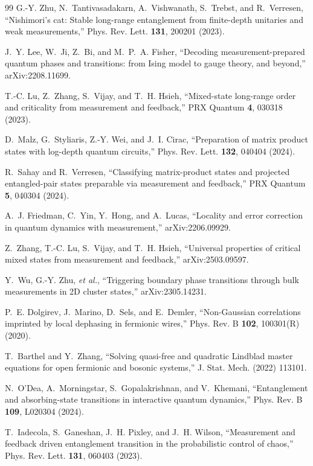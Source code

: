 \documentclass[aps,prl,twocolumn,floatfix,superscriptaddress,nofootinbib]{revtex4-2}
\begin{document}
\begin{thebibliography}{99}
G.-Y. Zhu, N.~Tantivasadakarn, A.~Vishwanath, S.~Trebst, and R.~Verresen,
``Nishimori's cat: Stable long-range entanglement from finite-depth unitaries and weak measurements,''
Phys. Rev. Lett. \textbf{131}, 200201 (2023).

J.~Y. Lee, W.~Ji, Z.~Bi, and M.~P.~A. Fisher,
``Decoding measurement-prepared quantum phases and transitions: from Ising model to gauge theory, and beyond,''
arXiv:2208.11699.

T.-C. Lu, Z.~Zhang, S.~Vijay, and T.~H. Hsieh,
``Mixed-state long-range order and criticality from measurement and feedback,''
PRX Quantum \textbf{4}, 030318 (2023).

D.~Malz, G.~Styliaris, Z.-Y. Wei, and J.~I. Cirac,
``Preparation of matrix product states with log-depth quantum circuits,''
Phys. Rev. Lett. \textbf{132}, 040404 (2024).

R.~Sahay and R.~Verresen,
``Classifying matrix-product states and projected entangled-pair states preparable via measurement and feedback,''
PRX Quantum \textbf{5}, 040304 (2024).

A.~J. Friedman, C.~Yin, Y.~Hong, and A.~Lucas,
``Locality and error correction in quantum dynamics with measurement,''
arXiv:2206.09929.

Z.~Zhang, T.-C. Lu, S.~Vijay, and T.~H. Hsieh,
``Universal properties of critical mixed states from measurement and feedback,''
arXiv:2503.09597.

Y.~Wu, G.-Y. Zhu, \emph{et al.},
``Triggering boundary phase transitions through bulk measurements in 2D cluster states,''
arXiv:2305.14231.

P.~E. Dolgirev, J.~Marino, D.~Sels, and E.~Demler,
``Non-Gaussian correlations imprinted by local dephasing in fermionic wires,''
Phys. Rev. B \textbf{102}, 100301(R) (2020).

T.~Barthel and Y.~Zhang,
``Solving quasi-free and quadratic Lindblad master equations for open fermionic and bosonic systems,''
J. Stat. Mech. (2022) 113101.

N.~O'Dea, A.~Morningstar, S.~Gopalakrishnan, and V.~Khemani,
``Entanglement and absorbing-state transitions in interactive quantum dynamics,''
Phys. Rev. B \textbf{109}, L020304 (2024).

T.~Iadecola, S.~Ganeshan, J.~H. Pixley, and J.~H. Wilson,
``Measurement and feedback driven entanglement transition in the probabilistic control of chaos,''
Phys. Rev. Lett. \textbf{131}, 060403 (2023).


\end{thebibliography}
\end{document}
